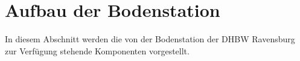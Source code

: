 
\clearpage
\section{Aufbau der Bodenstation}

In diesem Abschnitt werden die von der Bodenstation der \ac{DHBW} Ravensburg zur Verfügung stehende Komponenten vorgestellt.
